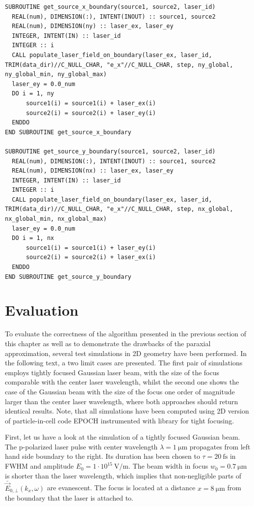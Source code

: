 \begin{lstlisting}[style=FORTRAN, caption=Fortran subroutines for populating laser sources on boundaries]
SUBROUTINE get_source_x_boundary(source1, source2, laser_id) 
  REAL(num), DIMENSION(:), INTENT(INOUT) :: source1, source2
  REAL(num), DIMENSION(ny) :: laser_ex, laser_ey
  INTEGER, INTENT(IN) :: laser_id
  INTEGER :: i
  CALL populate_laser_field_on_boundary(laser_ex, laser_id, TRIM(data_dir)//C_NULL_CHAR, "e_x"//C_NULL_CHAR, step, ny_global, ny_global_min, ny_global_max)
  laser_ey = 0.0_num
  DO i = 1, ny
	  source1(i) = source1(i) + laser_ex(i)
	  source2(i) = source2(i) + laser_ey(i)
  ENDDO
END SUBROUTINE get_source_x_boundary
  
SUBROUTINE get_source_y_boundary(source1, source2, laser_id)
  REAL(num), DIMENSION(:), INTENT(INOUT) :: source1, source2
  REAL(num), DIMENSION(nx) :: laser_ex, laser_ey
  INTEGER, INTENT(IN) :: laser_id
  INTEGER :: i
  CALL populate_laser_field_on_boundary(laser_ex, laser_id, TRIM(data_dir)//C_NULL_CHAR, "e_x"//C_NULL_CHAR, step, nx_global, nx_global_min, nx_global_max)
  laser_ey = 0.0_num
  DO i = 1, nx
	  source1(i) = source1(i) + laser_ey(i)
	  source2(i) = source2(i) + laser_ex(i)
  ENDDO
END SUBROUTINE get_source_y_boundary
\end{lstlisting}

\newpage
\section{Evaluation}

To evaluate the correctness of the algorithm presented in the previous section of this chapter as well as to demonstrate the drawbacks of the paraxial approximation, several test simulations in 2D geometry have been performed. In the following text, a two limit cases are presented. The first pair of simulations employs tightly focused Gaussian laser beam, with the size of the focus comparable with the center laser wavelength, whilst the second one shows the case of the Gaussian beam with the size of the focus one order of magnitude larger than the center laser wavelength, where both approaches should return identical results. Note, that all simulations have been computed using 2D version of particle-in-cell code EPOCH instrumented with library for tight focusing.

First, let us have a look at the simulation of a tightly focused Gaussian beam. The p-polarized laser pulse with center wavelength $ \lambda = 1 \: \mathrm{\mu m} $ propagates from left hand side boundary to the right. Its duration has been chosen to $ \tau = 20 \: \mathrm{fs} $ in FWHM and amplitude $ E_0 = 1 \cdot 10^{15} \: \mathrm{V/m} $. The beam width in focus $ w_0 = 0.7 \: \mathrm{\mu m} $ is shorter than the laser wavelength, which implies that non-negligible parts of $ \bar{\vec{E}}_{0, \bot}(k_x, \omega) $ are evanescent. The focus is located at a distance $ x = 8 \: \mathrm{\mu m} $ from the boundary that the laser is attached to.

